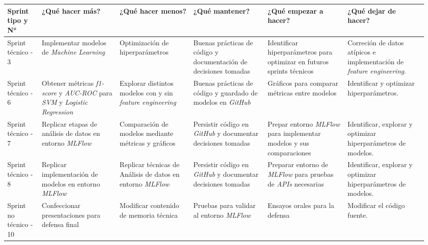 \documentclass[
11pt, %
]{charter}
\begin{document}
\begin{table}[htpb]
\renewcommand{\arraystretch}{1.4}
\begin{tabular}{|>{\raggedright\arraybackslash}p{1.8cm}|
                >{\raggedright\arraybackslash}p{2.3cm}|
                >{\raggedright\arraybackslash}p{2.3cm}|
                >{\raggedright\arraybackslash}p{2.3cm}|
                >{\raggedright\arraybackslash}p{2.3cm}|
                >{\raggedright\arraybackslash}p{2.3cm}|}
\hline
\rowcolor[HTML]{CCCCCC} 
\textbf{Sprint tipo y N°} & \textbf{¿Qué hacer más?} & \textbf{¿Qué hacer menos?} & \textbf{¿Qué mantener?} & \textbf{¿Qué empezar a hacer?} & \textbf{¿Qué dejar de hacer?} \\
\hline
Sprint técnico - 3 & Implementar modelos de \textit{Machine Learning} & Optimización de hiperparámetros & Buenas prácticas de código y documentación de decisiones tomadas & Identificar hiperparámetros para optimizar en futuros sprints técnicos & Correción de datos atípicos e implementación de \textit{feature engineering}. \\ \hline
Sprint técnico - 6 & Obtener métricas \textit{f1-score} y \textit{AUC-ROC} para \textit{SVM} y \textit{Logistic Regression} & Explorar distintos modelos con y sin \textit{feature engineering} & Buenas prácticas de código y guardado de modelos en \textit{GitHub} & Gráficos para comparar métricas entre modelos & Identificar y optimizar hiperparámetros. \\ \hline
Sprint técnico - 7 & Replicar etapas de análisis de datos en entorno \textit{MLFlow} & Comparación de modelos mediante métricas y gráficos & Persistir código en \textit{GitHub} y documentar decisiones tomadas & Prepar entorno \textit{MLFlow} para implementar modelos y sus comparaciones & Identificar, explorar y optimizar hiperparámetros de modelos. \\ \hline
Sprint técnico - 8 & Replicar implementación de modelos en entorno \textit{MLFlow} & Replicar técnicas de Análisis de datos en entorno \textit{MLFlow} & Persistir código en \textit{GitHub} y documentar decisiones tomadas & Preparar entorno de \textit{MLFlow} para pruebas de \textit{APIs} necesarias & Identificar, explorar y optimizar hiperparámetros de modelos. \\ \hline
Sprint no técnico - 10 & Confeccionar presentaciones para defensa final & Modificar contenido de memoria técnica & Pruebas para validar al entorno \textit{MLFlow} & Ensayos orales para la defensa & Modificar el código fuente. \\ \hline
\end{tabular}
\end{table}
\end{document}
